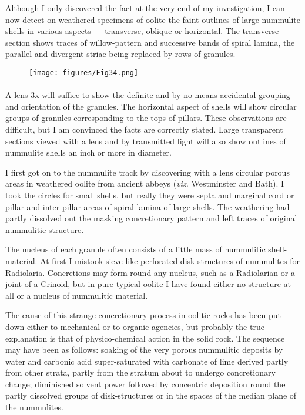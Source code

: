 \documentclass[a4paper, 12pt, oneside]{article}
\begin{document}
Although I only discovered the fact at the very end of my investigation, I can now detect on weathered specimens of oolite the faint outlines of large nummulite shells in various aspects --- transverse, oblique or horizontal. The transverse section shows traces of willow-pattern and successive bands of spiral lamina, the parallel and divergent striae being replaced by rows of granules.
\begin{figure}[H]
\centering
\texttt{[image: figures/Fig34.png]}
\caption*{}
\end{figure}
\paragraph{}
A lens 3x will suffice to show the definite and by no means accidental grouping and orientation of the granules. The horizontal aspect of shells will show circular groups of granules corresponding to the tops of pillars. These observations are difficult, but I am convinced the facts are correctly stated. Large transparent sections viewed with a lens and by transmitted light will also show outlines of nummulite shells an inch or more in diameter.

I first got on to the nummulite track by discovering with a lens circular porous areas in weathered oolite from ancient abbeys (\emph{viz.} Westminster and Bath). I took the circles for small shells, but really they were septa and marginal cord or pillar and inter-pillar areas of spiral lamina of large shells. The weathering had partly dissolved out the masking concretionary pattern and left traces of original nummulitic structure.

The nucleus of each granule often consists of a little mass of nummulitic shell-material. At first I mistook sieve-like perforated disk structures of nummulites for Radiolaria. Concretions may form round any nucleus, such as a Radiolarian or a joint of a Crinoid, but in pure typical oolite I have found either no structure at all or a nucleus of nummulitic material.

The cause of this strange concretionary process in oolitic rocks has been put down either to mechanical or to organic agencies, but probably the true explanation is that of physico-chemical action in the solid rock. The sequence may have been as follows: soaking of the very porous nummulitic deposits by water and carbonic acid super-saturated with carbonate of lime derived partly from other strata, partly from the stratum about to undergo concretionary change; diminished solvent power followed by concentric deposition round the partly dissolved groups of disk-structures or in the spaces of the median plane of the nummulites.
\end{document}
